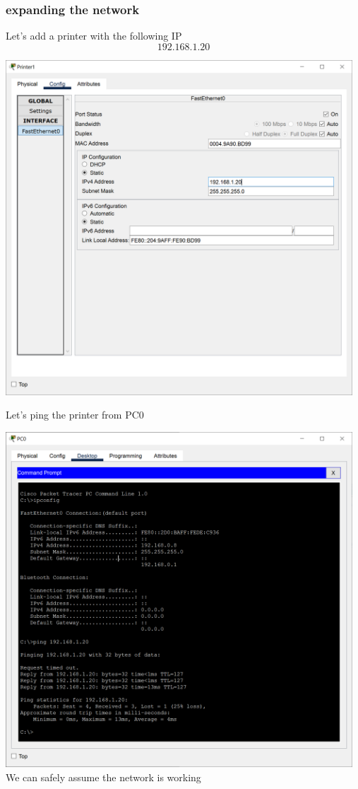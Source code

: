 \documentclass[a4paper,12pt]{book}
\begin{document}
\subsubsection{expanding the network}
\noindent Let's add a printer with the following IP
\[192.168.1.20\] \newline

\noindent \includegraphics[width=13cm]{./step-by-step/20.PNG}
\clearpage

\noindent Let's ping the printer from PC0\newline

\noindent \includegraphics[width=13cm]{./step-by-step/21.PNG} \newline
\noindent We can safely assume the network is working
\clearpage
\end{document}
